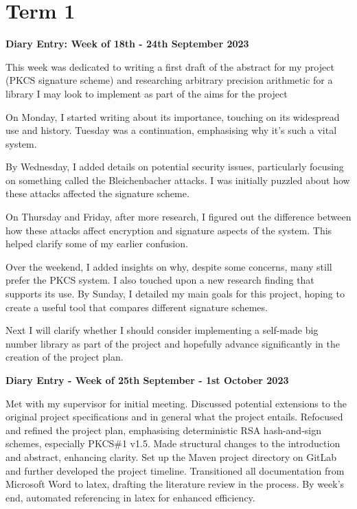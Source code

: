 \documentclass[]{final_report}
\theoremstyle{definition}
\begin{document}
\section{Term 1}

\textbf{Diary Entry: Week of 18th - 24th September 2023}

This week was dedicated to writing a first draft of the abstract for my project (PKCS signature scheme) and researching arbitrary precision arithmetic for a library I may look to implement as part of the aims for the project

On Monday, I started writing about its importance, touching on its widespread use and history.
Tuesday was a continuation, emphasising why it's such a vital system.

By Wednesday, I added details on potential security issues, particularly focusing on something
called the Bleichenbacher attacks. I was initially puzzled about how these attacks affected the
signature scheme.

On Thursday and Friday, after more research, I figured out the difference between how these attacks
affect encryption and signature aspects of the system. This helped clarify some of my earlier
confusion.

Over the weekend, I added insights on why, despite some concerns, many still prefer the PKCS system.
I also touched upon a new research finding that supports its use. By Sunday, I detailed my main
goals for this project, hoping to create a useful tool that compares different signature schemes.

Next I will clarify whether I should consider implementing a self-made big number library as part of
the project and hopefully advance significantly in the creation of the project plan.

\textbf{Diary Entry - Week of 25th September - 1st October 2023}

Met with my supervisor for initial meeting. Discussed potential extensions to the original project
specifications and in general what the project entails. Refocused and refined the project plan,
emphasising deterministic RSA hash-and-sign schemes, especially PKCS\#1 v1.5. Made structural changes
to the introduction and abstract, enhancing clarity. Set up the Maven project directory on GitLab
and further developed the project timeline. Transitioned all documentation from Microsoft Word to
latex, drafting the literature review in the process. By week's end, automated referencing in latex
for enhanced efficiency.
\end{document}
